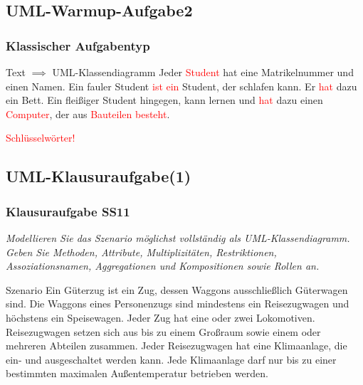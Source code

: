 \documentclass[18pt]{beamer}
\begin{document}
	\subsection{UML-Warmup-Aufgabe2}
	\begin{frame}
	\frametitle{Klassischer Aufgabentyp}
	\begin{exampleblock}{Text $\implies$ UML-Klassendiagramm}
		Jeder \textcolor{red}{Student} hat eine Matrikelnummer und einen Namen. Ein fauler Student \textcolor{red}{ist ein} Student, der schlafen kann. Er \textcolor{red}{hat} dazu ein Bett. Ein fleißiger Student hingegen, kann lernen und \textcolor{red}{hat} dazu einen \textcolor{red}{Computer}, der aus \textcolor{red}{Bauteilen} \textcolor{red}{besteht}.
	\end{exampleblock}
	\textcolor{red}{Schlüsselwörter!}
\end{frame}
	
	\subsection{UML-Klausuraufgabe(1)}
	\begin{frame}
		\frametitle{Klausuraufgabe SS11}
		\textit{Modellieren Sie das Szenario möglichst vollständig als UML-Klassendiagramm. Geben Sie Methoden, Attribute, Multiplizitäten, Restriktionen, Assoziationsnamen, Aggregationen und Kompositionen sowie Rollen an.} 
		\begin{block}{Szenario}
			Ein Güterzug ist ein Zug, dessen Waggons ausschließlich Güterwagen sind. Die Waggons eines Personenzugs sind mindestens ein Reisezugwagen und höchstens ein Speisewagen. Jeder Zug hat eine oder zwei Lokomotiven. Reisezugwagen setzen sich aus bis zu einem Großraum sowie einem oder mehreren Abteilen zusammen. Jeder Reisezugwagen hat eine Klimaanlage, die ein- und ausgeschaltet werden kann. Jede Klimaanlage darf
			nur bis zu einer bestimmten maximalen Außentemperatur betrieben werden.
		\end{block}
	\end{frame}
	
\end{document}
